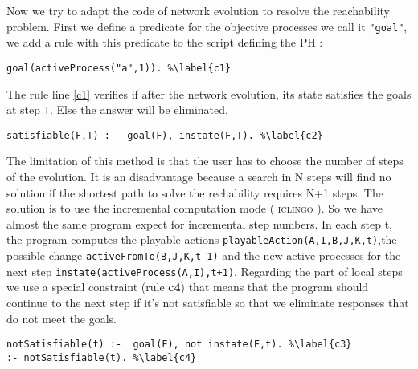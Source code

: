 \noindent Now we try to adapt the code of network evolution to resolve the reachability problem. First we define a predicate for the objective processes we call it \texttt{"goal"}, we add a rule with this predicate to the script defining the PH :
\begin{lstlisting}
goal(activeProcess("a",1)). %\label{c1}
\end{lstlisting}
The rule line \ref{c1} verifies if after the network evolution, its state satisfies the goals at step \texttt{T}. Else the answer will be eliminated.
\begin{lstlisting}
satisfiable(F,T) :-  goal(F), instate(F,T). %\label{c2}
\end{lstlisting}
The limitation of this method is that the user has to choose the number of steps of the evolution. It is an disadvantage because a search in N steps will find no solution if the shortest path to solve the rechability requires N+1 steps. The solution is to use the incremental computation mode ( \textsc{iclingo} \cite{gebser2008user}).
So we have almost the same program expect for incremental step numbers. In each step t, the program computes the playable actions \texttt{playableAction(A,I,B,J,K,t)},the possible change \texttt{activeFromTo(B,J,K,t-1)} and the new active processes for the next step \texttt{instate(activeProcess(A,I),t+1)}. Regarding the part of local steps we use a special constraint (rule \textbf{c4}) that means that the program should continue to the next step if it's not satisfiable so that we eliminate responses that do not meet the goals.
\begin{lstlisting}
notSatisfiable(t) :-  goal(F), not instate(F,t). %\label{c3}
:- notSatisfiable(t). %\label{c4}
\end{lstlisting}
